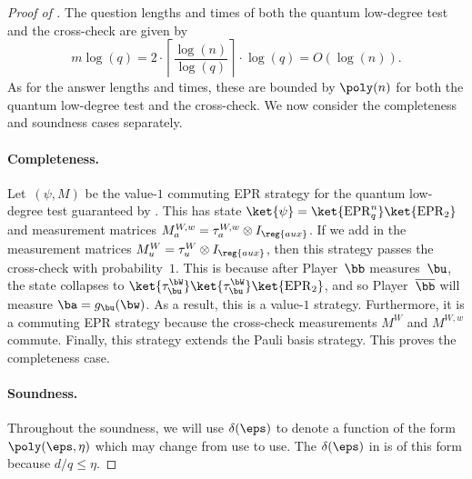 \begin{proof}[Proof of ]
The question lengths and times of both the quantum low-degree test and the cross-check are given by
\begin{equation*}
m \log(q) = 2\cdot \left\lceil \frac{\log(n)}{\log(q)}\right\rceil  \cdot \log(q) = O(\log(n)).
\end{equation*}
As for the answer lengths and times, these are bounded by $\poly(n)$ for both the quantum low-degree test and the cross-check.
We now consider the completeness and soundness cases separately.
\paragraph{Completeness.}
Let~$(\psi, M)$ be the value-$1$ commuting EPR strategy for the quantum low-degree test guaranteed by .
This has state $\ket{\psi} = \ket{\mathrm{EPR}_q^n} \ket{\mathrm{EPR}_2}$ and measurement matrices $M^{W,w}_a = \tau^{W,w}_a \otimes I_{\reg{aux}}$.
If we add in the measurement matrices $M^W_u = \tau^W_u \otimes I_{\reg{aux}}$,
then this strategy passes the cross-check with probability~$1$.
This is because after Player~$\bb$ measures~$\bu$,
the state collapses to $\ket{\tau^{\bW}_{\bu}}\ket{\tau^{\bW}_{\bu}} \ket{\mathrm{EPR}_2}$,
and so Player~$\overline{\bb}$ will measure $\ba = g_{\bu}(\bw)$.
As a result, this is a value-$1$ strategy.
Furthermore, it is a commuting EPR strategy because the cross-check measurements $M^W$ and $M^{W,w}$ commute.
Finally, this strategy extends the Pauli basis strategy.
This proves the completeness case.

\paragraph{Soundness.}
Throughout the soundness, we will use $\delta(\eps)$ to denote a function of the form $\poly(\eps, \eta)$ which may change from use to use.
The $\delta(\eps)$ in  is of this form because $d/q\leq \eta$.


\end{proof}
